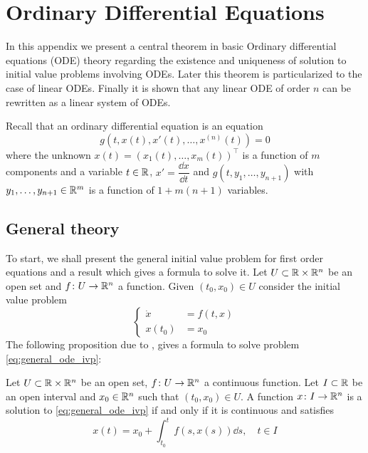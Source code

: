 
\section{Ordinary Differential Equations}

In this appendix we present a central theorem in basic Ordinary differential
equations (ODE) theory regarding the existence and uniqueness of solution to
initial value problems involving ODEs. Later this theorem is particularized to
the case of linear ODEs. Finally it is shown that any linear ODE of order $n$
can be rewritten as a linear system of ODEs.

Recall that an ordinary differential equation is an equation
\begin{equation*}
	g(t, x(t), x'(t), \ldots, x^{(n)}(t)) = 0
\end{equation*}
where the unknown $x(t) = (x_1(t), \ldots, x_m(t))^\top$ is a function of $m$
components and a variable $t \in \mathbb{R}$, $x' = \dfrac{\dd{x}}{\dd{t}}$ and $g(t,
y_1, \ldots, y_{n+1})$ with $y_1, \ldots, y_{n+1} \in \mathbb{R}^m$ is a function of
$1 + m(n+1)$ variables.

\subsection{General theory}

To start, we shall present the general initial value problem for first order
equations and a result which gives a formula to solve it. Let $U \subset \mathbb{R}
\times \mathbb{R}^n$ be an open set and $f \colon U \rightarrow \mathbb{R}^n$ a function.
Given $(t_0, x_0) \in U$ consider the initial value problem
\begin{equation} \label{eq:general_ode_ivp}
	\left\{
		\begin{aligned}
			\dot{x} &= f(t,x) \\
			x(t_0) &= x_0
		\end{aligned}
	\right.
\end{equation}
\noindent
The following proposition due to \cite{pau2020ode}, gives a formula to solve
problem \eqref{eq:general_ode_ivp}:
\begin{prop} \label{eq:ode_general_formula}
	Let $U \subset \mathbb{R} \times \mathbb{R}^n$ be an open set, $f \colon U \rightarrow
	\mathbb{R}^n$ a continuous function. Let $I \subset \mathbb{R}$ be an open interval
	and $x_0 \in \mathbb{R}^n$ such that $(t_0, x_0) \in U$. A function $x \colon I
	\rightarrow \mathbb{R}^n$ is a solution to \eqref{eq:general_ode_ivp} if and only
	if it is continuous and satisfies
	\begin{equation*}
		x(t) = x_0 + \int_{t_0}^t f(s,x(s)) \dd{s}, \quad t \in I
	\end{equation*}
\end{prop}

